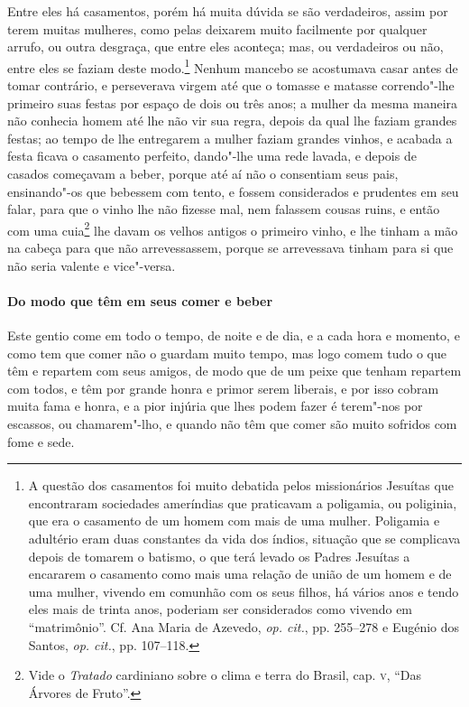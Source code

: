 Entre eles há casamentos, porém há muita dúvida se são
verdadeiros, assim por terem muitas mulheres, como pelas deixarem muito
facilmente por qualquer arrufo, ou outra desgraça, que entre eles
aconteça; mas, ou verdadeiros ou não, entre eles se faziam deste 
modo.\footnote{ A questão dos casamentos foi muito debatida pelos
missionários Jesuítas que encontraram sociedades ameríndias que
praticavam a poligamia, ou poliginia, que era o casamento de um homem
com mais de uma mulher. Poligamia e adultério eram duas constantes da
vida dos índios, situação que se complicava depois de tomarem o
batismo, o que terá levado os Padres Jesuítas a encararem o casamento
como mais uma relação de união de um homem e de uma mulher, vivendo em
comunhão com os seus filhos, há vários anos e tendo eles mais de trinta
anos, poderiam ser considerados como vivendo em ``matrimônio''. Cf. Ana
Maria de Azevedo, \textit{op. cit.}, pp. 255--278 e Eugénio dos Santos,
\textit{op. cit.}, pp. 107--118.} Nenhum mancebo se acostumava casar
antes de tomar contrário, e perseverava virgem até que o tomasse e
matasse correndo"-lhe primeiro suas festas por espaço de dois ou três
anos; a mulher da mesma maneira não conhecia homem até lhe não vir sua
regra, depois da qual lhe faziam grandes festas; ao tempo de lhe
entregarem a mulher faziam grandes vinhos, e acabada a festa ficava o
casamento perfeito, dando"-lhe uma rede lavada, e depois de casados
começavam a beber, porque até aí não o consentiam seus pais,
ensinando"-os que bebessem com tento, e fossem considerados e prudentes
em seu falar, para que o vinho lhe não fizesse mal, nem falassem
cousas ruins, e então com uma cuia\footnote{ Vide o \textit{Tratado}
cardiniano sobre o clima e terra do Brasil, cap. \textsc{v}, ``Das Árvores de
Fruto''.} lhe davam os velhos antigos o primeiro vinho, e lhe tinham a
mão na cabeça para que não arrevessassem, porque se arrevessava tinham
para si que não seria valente e vice"-versa. 

\paragraph{Do modo que têm em seus comer e beber}

Este gentio come em todo o tempo, de noite e de dia, e a cada
hora e momento, e como tem que comer não o guardam muito tempo, mas
logo comem tudo o que têm e repartem com seus amigos, de modo que de um
peixe que tenham repartem com todos, e têm por grande honra e primor
serem liberais, e por isso cobram muita fama e honra, e a pior injúria
que lhes podem fazer é terem"-nos por escassos, ou chamarem"-lho, e
quando não têm que comer são muito sofridos com fome e sede.


